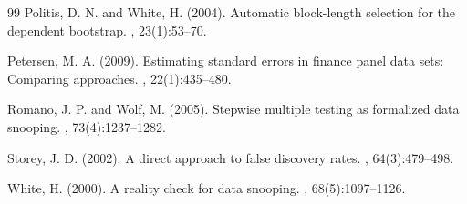 \documentclass[12pt,a4paper]{article}
\begin{document}
\begin{thebibliography}{99}
Politis, D. N. and White, H. (2004).
\newblock Automatic block-length selection for the dependent bootstrap.
, 23(1):53--70.

Petersen, M. A. (2009).
\newblock Estimating standard errors in finance panel data sets: Comparing approaches.
, 22(1):435--480.

Romano, J. P. and Wolf, M. (2005).
\newblock Stepwise multiple testing as formalized data snooping.
, 73(4):1237--1282.

Storey, J. D. (2002).
\newblock A direct approach to false discovery rates.
, 64(3):479--498.

White, H. (2000).
\newblock A reality check for data snooping.
, 68(5):1097--1126.

\end{thebibliography}
\end{document}
